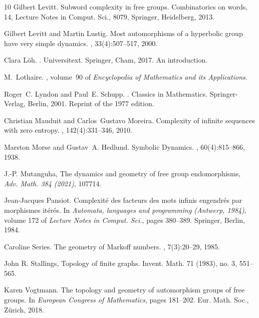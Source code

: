 \documentclass[11pt]{amsart}
\theoremstyle{remark}
\begin{document}
\begin{thebibliography}{10}
Gilbert Levitt. Subword complexity in free groups. Combinatorics on words, 14, Lecture Notes in Comput. Sci., 8079, Springer, Heidelberg, 2013. 

Gilbert Levitt and Martin Lustig.
\newblock Most automorphisms of a hyperbolic group have very simple dynamics.
, 33(4):507--517, 2000.

Clara L\"{o}h.
.
\newblock Universitext. Springer, Cham, 2017.
\newblock An introduction.

M.~Lothaire.
, volume~90 of {\em
  Encyclopedia of Mathematics and its Applications}.

Roger~C. Lyndon and Paul~E. Schupp.
.
\newblock Classics in Mathematics. Springer-Verlag, Berlin, 2001.
\newblock Reprint of the 1977 edition.

Christian Mauduit and Carlos~Gustavo Moreira.
\newblock Complexity of infinite sequences with zero entropy.
, 142(4):331--346, 2010.

Marston Morse and Gustav~A. Hedlund.
\newblock Symbolic {D}ynamics.
, 60(4):815--866, 1938.

   J.-P. Mutanguha, \newblock The dynamics and geometry of free group endomorphisms, \newblock 
 {\em Adv. Math. 384 (2021)},  107714.


Jean-Jacques Pansiot.
\newblock Complexit\'{e} des facteurs des mots infinis engendr\'{e}s par
  morphismes it\'{e}r\'{e}s.
\newblock In {\em Automata, languages and programming ({A}ntwerp, 1984)},
  volume 172 of {\em Lecture Notes in Comput. Sci.}, pages 380--389. Springer,
  Berlin, 1984.

Caroline Series.
\newblock The geometry of {M}arkoff numbers.
, 7(3):20--29, 1985.

\newblock  John R. Stallings,  Topology of finite graphs. Invent. Math. 71 (1983), no. 3, 551--565. 

Karen Vogtmann.
\newblock The topology  and geometry of automorphism groups of free groups.
\newblock In {\em European {C}ongress of {M}athematics}, pages 181--202. Eur.
  Math. Soc., Z\"{u}rich, 2018.

\end{thebibliography}
\end{document}
